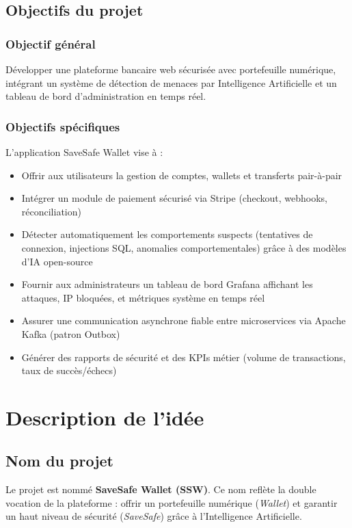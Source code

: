 \documentclass[12pt,a4paper]{report}
\begin{document}
\section{Objectifs du projet}

\subsection{Objectif général}
Développer une plateforme bancaire web sécurisée avec portefeuille numérique, intégrant un système de détection de menaces par Intelligence Artificielle et un tableau de bord d'administration en temps réel.

\subsection{Objectifs spécifiques}
L'application SaveSafe Wallet vise à :
\begin{itemize}[leftmargin=*,label=--]
\item Offrir aux utilisateurs la gestion de comptes, wallets et transferts pair-à-pair
\item Intégrer un module de paiement sécurisé via Stripe (checkout, webhooks, réconciliation)
\item Détecter automatiquement les comportements suspects (tentatives de connexion, injections SQL, anomalies comportementales) grâce à des modèles d'IA open-source
\item Fournir aux administrateurs un tableau de bord Grafana affichant les attaques, IP bloquées, et métriques système en temps réel
\item Assurer une communication asynchrone fiable entre microservices via Apache Kafka (patron Outbox)
\item Générer des rapports de sécurité et des KPIs métier (volume de transactions, taux de succès/échecs)
\end{itemize}


\chapter{Description de l'idée}

\section{Nom du projet}
Le projet est nommé \textbf{SaveSafe Wallet (SSW)}. Ce nom reflète la double vocation de la plateforme : offrir un portefeuille numérique (\textit{Wallet}) et garantir un haut niveau de sécurité (\textit{SaveSafe}) grâce à l'Intelligence Artificielle.
\end{document}
